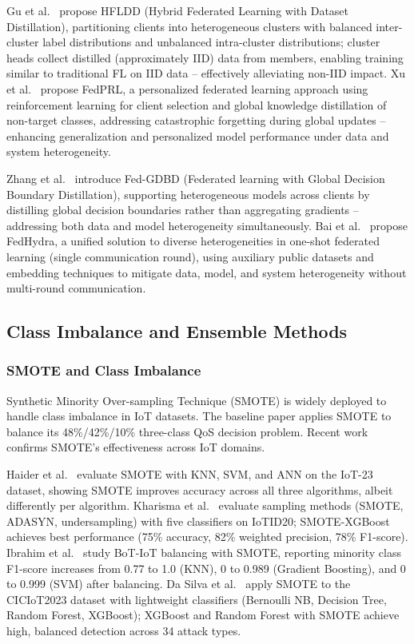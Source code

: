 Gu et al.\ \cite{Gu24ARXIV} propose HFLDD (Hybrid Federated Learning with Dataset Distillation), partitioning clients into heterogeneous clusters with balanced inter-cluster label distributions and unbalanced intra-cluster distributions; cluster heads collect distilled (approximately IID) data from members, enabling training similar to traditional FL on IID data -- effectively alleviating non-IID impact. Xu et al.\ \cite{Xu24SREP} propose FedPRL, a personalized federated learning approach using reinforcement learning for client selection and global knowledge distillation of non-target classes, addressing catastrophic forgetting during global updates -- enhancing generalization and personalized model performance under data and system heterogeneity.

Zhang et al.\ \cite{Zhang25JKSUCIS} introduce Fed-GDBD (Federated learning with Global Decision Boundary Distillation), supporting heterogeneous models across clients by distilling global decision boundaries rather than aggregating gradients -- addressing both data and model heterogeneity simultaneously. Bai et al.\ \cite{Bai25KDD} propose FedHydra, a unified solution to diverse heterogeneities in one-shot federated learning (single communication round), using auxiliary public datasets and embedding techniques to mitigate data, model, and system heterogeneity without multi-round communication.

\subsection{Class Imbalance and Ensemble Methods}
\label{subsec:imbalance-ensemble}

\subsubsection{SMOTE and Class Imbalance}

Synthetic Minority Over-sampling Technique (SMOTE) is widely deployed to handle class imbalance in IoT datasets. The baseline paper \cite{EtTousy26} applies SMOTE to balance its 48\%/42\%/10\% three-class QoS decision problem. Recent work confirms SMOTE's effectiveness across IoT domains.

Haider et al.\ \cite{Haider23IEC} evaluate SMOTE with KNN, SVM, and ANN on the IoT-23 dataset, showing SMOTE improves accuracy across all three algorithms, albeit differently per algorithm. Kharisma et al.\ \cite{Kharisma24ELEC} evaluate sampling methods (SMOTE, ADASYN, undersampling) with five classifiers on IoTID20; SMOTE-XGBoost achieves best performance (75\% accuracy, 82\% weighted precision, 78\% F1-score). Ibrahim et al.\ \cite{Ibrahim24IJICIS} study BoT-IoT balancing with SMOTE, reporting minority class F1-score increases from 0.77 to 1.0 (KNN), 0 to 0.989 (Gradient Boosting), and 0 to 0.999 (SVM) after balancing. Da Silva et al.\ \cite{DaSilva25JISA} apply SMOTE to the CICIoT2023 dataset with lightweight classifiers (Bernoulli NB, Decision Tree, Random Forest, XGBoost); XGBoost and Random Forest with SMOTE achieve high, balanced detection across 34 attack types.

